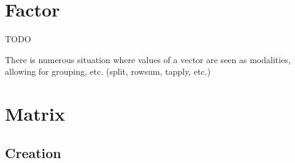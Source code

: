 \documentclass[pdflatex]{article}
\begin{document}
\section{Factor}

TODO

There is numerous situation where values of a vector are seen as modalities, allowing for grouping, etc. (split, rowsum, tapply, etc.)

\section{Matrix}

\subsection{Creation}
\end{document}
